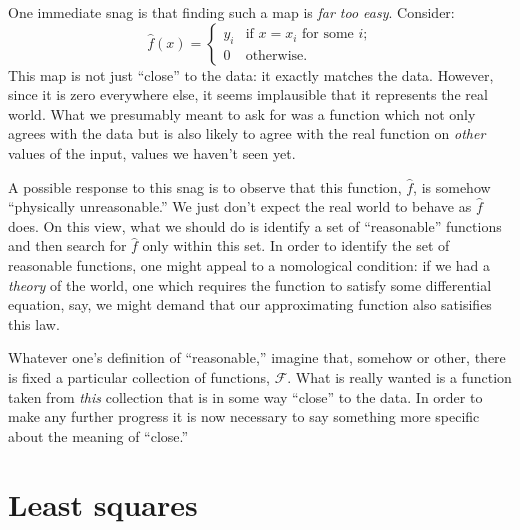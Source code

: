 \documentclass[10pt, a4paper]{article}
\begin{document}
One immediate snag is that finding such a map is \emph{far too
  easy}. Consider:
\begin{equation*}
  \hat{f}(x) =
  \begin{cases}
    y_i & \text{if $x = x_i$ for some $i$;} \\
      0 & \text{otherwise}.
  \end{cases}
\end{equation*}
This map is not just “close” to the data: it exactly matches the
data. However, since it is zero everywhere else, it seems implausible
that it represents the real world. What we presumably meant to ask for
was a function which not only agrees with the data but is also likely
to agree with the real function on \emph{other} values of the input,
values we haven't seen yet.

A possible response to this snag is to observe that this function,
$\hat{f}$, is somehow “physically unreasonable.” We just don't expect
the real world to behave as $\hat{f}$ does. On this view, what we
should do is identify a set of “reasonable” functions and then search
for $\hat{f}$ only within this set. In order to identify the set of
reasonable functions, one might appeal to a nomological condition: if
we had a \emph{theory} of the world, one which requires the function
to satisfy some differential equation, say, we might demand that our
approximating function also satisifies this law.

Whatever one's definition of “reasonable,” imagine that, somehow or
other, there is fixed a particular collection of functions,
$\mathcal{F}$. What is really wanted is a function taken from \emph{this}
collection that is in some way “close” to the data. In order to make any
further progress it is now necessary to say something more specific
about the meaning of “close.”

\section{Least squares}
\end{document}
